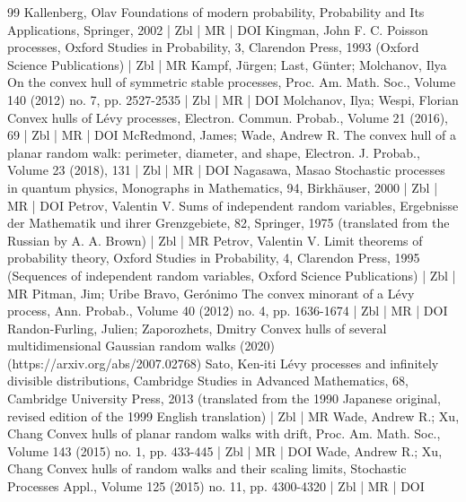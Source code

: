 \documentclass[10pt]{amsart}
\theoremstyle{definition}\newtheorem{defi}[theo]{Definition}\newtheorem{rema}[theo]{Remark}\newtheorem{exam}[theo]{Example}\newtheorem{exem}[theo]{Example}\newtheorem{nota}[theo]{Notation}
\newcommand\1{\mathds{1}}
\begin{document}
\begin{thebibliography}{99}
Kallenberg, Olav Foundations of modern probability, Probability and Its Applications, Springer, 2002 | Zbl | MR | DOI
Kingman, John F. C. Poisson processes, Oxford Studies in Probability, 3, Clarendon Press, 1993 (Oxford Science Publications) | Zbl | MR
Kampf, Jürgen; Last, Günter; Molchanov, Ilya On the convex hull of symmetric stable processes, Proc. Am. Math. Soc., Volume 140 (2012) no. 7, pp. 2527-2535 | Zbl | MR | DOI
Molchanov, Ilya; Wespi, Florian Convex hulls of Lévy processes, Electron. Commun. Probab., Volume 21 (2016), 69 | Zbl | MR | DOI
McRedmond, James; Wade, Andrew R. The convex hull of a planar random walk: perimeter, diameter, and shape, Electron. J. Probab., Volume 23 (2018), 131 | Zbl | MR | DOI
Nagasawa, Masao Stochastic processes in quantum physics, Monographs in Mathematics, 94, Birkhäuser, 2000 | Zbl | MR | DOI
Petrov, Valentin V. Sums of independent random variables, Ergebnisse der Mathematik und ihrer Grenzgebiete, 82, Springer, 1975 (translated from the Russian by A. A. Brown) | Zbl | MR
Petrov, Valentin V. Limit theorems of probability theory, Oxford Studies in Probability, 4, Clarendon Press, 1995 (Sequences of independent random variables, Oxford Science Publications) | Zbl | MR
Pitman, Jim; Uribe Bravo, Gerónimo The convex minorant of a Lévy process, Ann. Probab., Volume 40 (2012) no. 4, pp. 1636-1674 | Zbl | MR | DOI
Randon-Furling, Julien; Zaporozhets, Dmitry Convex hulls of several multidimensional Gaussian random walks (2020) (https://arxiv.org/abs/2007.02768)
Sato, Ken-iti Lévy processes and infinitely divisible distributions, Cambridge Studies in Advanced Mathematics, 68, Cambridge University Press, 2013 (translated from the 1990 Japanese original, revised edition of the 1999 English translation) | Zbl | MR
Wade, Andrew R.; Xu, Chang Convex hulls of planar random walks with drift, Proc. Am. Math. Soc., Volume 143 (2015) no. 1, pp. 433-445 | Zbl | MR | DOI
Wade, Andrew R.; Xu, Chang Convex hulls of random walks and their scaling limits, Stochastic Processes Appl., Volume 125 (2015) no. 11, pp. 4300-4320 | Zbl | MR | DOI
\end{thebibliography}
\end{document}
